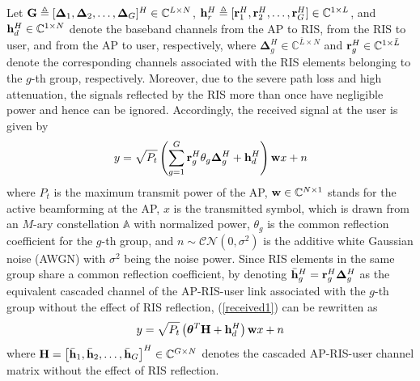 \documentclass[draftclsnofoot,onecolumn,12pt]{IEEEtran}
\begin{document}
Let ${\bf G}\triangleq[{\bm \Delta}_{1},{\bm \Delta}_{2},\ldots,{\bm \Delta}_{G}]^H\in\mathbb{C}^{L\times N}$, ${\bf h}_r^H\triangleq[{\bf r}_{1}^H,{\bf r}_{2}^H,\ldots,{\bf r}_{G}^H] \in\mathbb{C}^{1\times L}$, and ${\bf h}_d^H \in\mathbb{C}^{1\times N}$ denote the baseband channels from the AP to RIS, from the RIS to user, and from the AP to user, respectively, where ${\bm \Delta}_{g}^H\in\mathbb{C}^{\bar{L}\times N}$ and ${\bf r}_{g}^H\in\mathbb{C}^{1\times \bar{L}}$ denote the corresponding channels associated with the RIS elements belonging to the $g$-th group, respectively. 
Moreover, due to the severe path loss and high attenuation, {the} signals reflected by the RIS more than once have negligible power and hence can be ignored. 
Accordingly, the received signal at the user 
is given by
\begin{align}
{ y}= \sqrt{P_t}\left( \sum_{g=1}^{G}{\bf r}_{g}^H { \theta}_g {\bm \Delta}_{g}^H  +{\bf h}_d^H \right) {\bf w}{ x}  +{n}\label{received1}
\end{align}
where $P_t$ is the maximum transmit power of the AP, ${\bf w} \in \mathbb{C}^{N \times 1}$ stands for the active beamforming at the AP,
${ x}$ is the transmitted symbol,
which is drawn from an $M\text{-ary}$ constellation $\mathbb{A}$ with normalized power, $\theta_g$ is the common reflection coefficient for the $g$-th group, 
and ${ n}\sim \mathcal{CN}( { 0},\sigma^2)$ is the additive white Gaussian noise (AWGN) with $\sigma^2$ being the noise power. 
Since RIS elements in the same group share a common reflection coefficient, by denoting $\bar{\bf h}_g^H={\bf r}_{g}^H {\bm \Delta}_{g}^H$ as the equivalent cascaded channel of the AP-RIS-user link associated with the $g$-th group without the effect of RIS reflection, (\ref{received1}) can be rewritten as
\begin{align} 
{ y}=\sqrt{P_t}\left({\bm \theta}^T{\bf H}+ {\bf h}_d^H\right) {\bf w}{ x}+{ n}\label{received2}
\end{align}
where ${\bf H}=\left[\bar{\bf h}_{1},\bar{\bf h}_{2},\ldots,\bar{\bf h}_{G}\right]^H\in\mathbb{C}^{G \times N}$ denotes the cascaded AP-RIS-user channel matrix without the effect of RIS reflection. 
\end{document}
